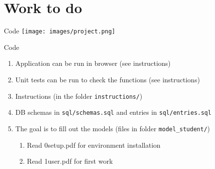 \documentclass{beamer}
\begin{document}
\section{Work to do}

\begin{frame}{Code}
\center
\texttt{[image: images/project.png]}  
\end{frame}

\begin{frame}{Code}
    \begin{center}
    \end{center}

\begin{enumerate}

\item Application can be run in browser (see instructions)
\item Unit tests can be run to check the functions (see instructions)
\item Instructions (in the folder \texttt{instructions/})
\item DB schemas in \texttt{sql/schemas.sql} and entries in \texttt{sql/entries.sql}
\item The goal is to fill out the models (files in folder \texttt{model\_student/})
\begin{enumerate}
\item Read 0setup.pdf for environment installation
\item Read 1user.pdf for first work
\end{enumerate}
\end{enumerate}

\end{frame}
\end{document}
